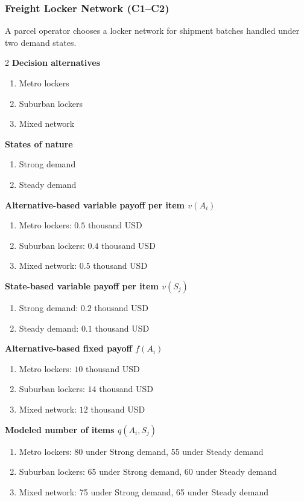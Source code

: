 	\subsubsection{Freight Locker Network (C1--C2)}
	\label{sec:problem27-freight-locker-network-c1-c2}
	A parcel operator chooses a locker network for shipment batches handled under two demand states.
	\begin{multicols}{2}
	\textbf{Decision alternatives}
	\begin{enumerate}[label=\arabic*.]
\item Metro lockers
\item Suburban lockers
\item Mixed network
	\end{enumerate}
	\textbf{States of nature}
	\begin{enumerate}[label=\arabic*.]
\item Strong demand
\item Steady demand
	\end{enumerate}
	\columnbreak
	\textbf{Alternative-based variable payoff per item $v(A_i)$}
\begin{enumerate}[label=\arabic*.]
\item Metro lockers: $0.5$ thousand USD
\item Suburban lockers: $0.4$ thousand USD
\item Mixed network: $0.5$ thousand USD\end{enumerate}
\textbf{State-based variable payoff per item $v(S_j)$}
\begin{enumerate}[label=\arabic*.]
\item Strong demand: $0.2$ thousand USD
\item Steady demand: $0.1$ thousand USD\end{enumerate}
\textbf{Alternative-based fixed payoff $f(A_i)$}
\begin{enumerate}[label=\arabic*.]
\item Metro lockers: $10$ thousand USD
\item Suburban lockers: $14$ thousand USD
\item Mixed network: $12$ thousand USD\end{enumerate}
\textbf{Modeled number of items $q(A_i,S_j)$}
\begin{enumerate}[label=\arabic*.]
\item Metro lockers: 80 under Strong demand, 55 under Steady demand
\item Suburban lockers: 65 under Strong demand, 60 under Steady demand
\item Mixed network: 75 under Strong demand, 65 under Steady demand
\end{enumerate}
	\end{multicols}

